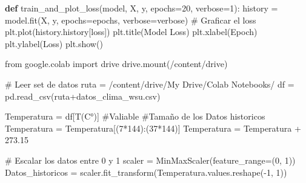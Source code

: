 \documentclass[
  us-letterpaper,
]{scrreprt}
\newenvironment{Shaded}{\begin{snugshade}}{\end{snugshade}}
\newcommand{\CommentTok}[1]{\textcolor[rgb]{0.37,0.37,0.37}{#1}}
\newcommand{\DecValTok}[1]{\textcolor[rgb]{0.68,0.00,0.00}{#1}}
\newcommand{\FloatTok}[1]{\textcolor[rgb]{0.68,0.00,0.00}{#1}}
\newcommand{\ImportTok}[1]{\textcolor[rgb]{0.00,0.46,0.62}{#1}}
\newcommand{\KeywordTok}[1]{\textcolor[rgb]{0.00,0.23,0.31}{\textbf{#1}}}
\newcommand{\NormalTok}[1]{\textcolor[rgb]{0.00,0.23,0.31}{#1}}
\newcommand{\OperatorTok}[1]{\textcolor[rgb]{0.37,0.37,0.37}{#1}}
\newcommand{\StringTok}[1]{\textcolor[rgb]{0.13,0.47,0.30}{#1}}
\theoremstyle{plain}
\theoremstyle{definition}
\theoremstyle{definition}
\theoremstyle{remark}
\begin{document}
\begin{Shaded}
\begin{Highlighting}[]
\KeywordTok{def}\NormalTok{ train\_and\_plot\_loss(model, X, y, epochs}\OperatorTok{=}\DecValTok{20}\NormalTok{, verbose}\OperatorTok{=}\DecValTok{1}\NormalTok{):}
\NormalTok{    history }\OperatorTok{=}\NormalTok{ model.fit(X, y, epochs}\OperatorTok{=}\NormalTok{epochs, verbose}\OperatorTok{=}\NormalTok{verbose)}
    \CommentTok{\# Graficar el loss}
\NormalTok{    plt.plot(history.history[}\StringTok{\textquotesingle{}loss\textquotesingle{}}\NormalTok{])}
\NormalTok{    plt.title(}\StringTok{\textquotesingle{}Model Loss\textquotesingle{}}\NormalTok{)}
\NormalTok{    plt.xlabel(}\StringTok{\textquotesingle{}Epoch\textquotesingle{}}\NormalTok{)}
\NormalTok{    plt.ylabel(}\StringTok{\textquotesingle{}Loss\textquotesingle{}}\NormalTok{)}
\NormalTok{    plt.show()}

    
    
\ImportTok{from}\NormalTok{ google.colab }\ImportTok{import}\NormalTok{ drive}
\NormalTok{drive.mount(}\StringTok{\textquotesingle{}/content/drive\textquotesingle{}}\NormalTok{)}


\CommentTok{\# Leer set de datos}
\NormalTok{ruta }\OperatorTok{=} \StringTok{\textquotesingle{}/content/drive/My Drive/Colab Notebooks/\textquotesingle{}}
\NormalTok{df }\OperatorTok{=}\NormalTok{ pd.read\_csv(ruta}\OperatorTok{+}\StringTok{\textquotesingle{}datos\_clima\_wsu.csv\textquotesingle{}}\NormalTok{)}

\NormalTok{Temperatura }\OperatorTok{=}\NormalTok{ df[}\StringTok{\textquotesingle{}T(C°)\textquotesingle{}}\NormalTok{] }\CommentTok{\#Valiable}
\CommentTok{\#Tamaño de los Datos historicos}
\NormalTok{Temperatura }\OperatorTok{=}\NormalTok{ Temperatura[(}\DecValTok{7}\OperatorTok{*}\DecValTok{144}\NormalTok{):(}\DecValTok{37}\OperatorTok{*}\DecValTok{144}\NormalTok{)] }
\NormalTok{Temperatura }\OperatorTok{=}\NormalTok{ Temperatura }\OperatorTok{+} \FloatTok{273.15} 

\CommentTok{\# Escalar los datos entre 0 y 1}
\NormalTok{scaler }\OperatorTok{=}\NormalTok{ MinMaxScaler(feature\_range}\OperatorTok{=}\NormalTok{(}\DecValTok{0}\NormalTok{, }\DecValTok{1}\NormalTok{))}
\NormalTok{Datos\_historicos }\OperatorTok{=}\NormalTok{ scaler.fit\_transform(Temperatura.values.reshape(}\OperatorTok{{-}}\DecValTok{1}\NormalTok{, }\DecValTok{1}\NormalTok{))}
\end{Highlighting}
\end{Shaded}
\end{document}
